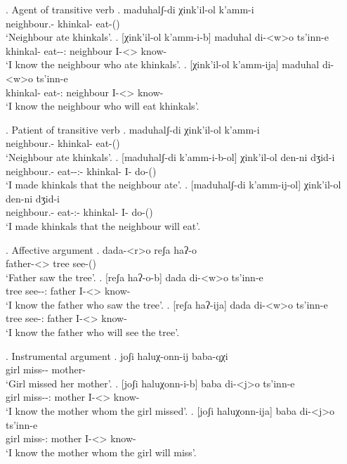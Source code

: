 \ex. Agent of transitive verb
	\ag. maduhalʃ-di χink'il-ol k'amm-i\\
			{neighbour.\Obl-\Erg} {khinkal-\Pl} {eat-\Pst(\Aor)}\\
			\glt `Neighbour ate khinkals'.
	\bg. [χink'il-ol k'amm-i-b] maduhal di-<w>o ts'inn-e \\
			{khinkal-\Pl} {eat-\Pst-\Ptcp:\Pst} neighbour {I-<\M>\Aff} {know-\Hab} \\
		 \glt    `I know the neighbour who ate khinkals'.
	\bg. [χink'il-ol k'amm-ija] maduhal di-<w>o ts'inn-e \\
			{khinkal-\Pl} {eat-\Ptcp:\Prae} neighbour {I-<\M>\Aff} {know-\Hab} \\
		 \glt    `I know the neighbour who will eat khinkals'.

\ex. Patient of transitive verb
	\ag. maduhalʃ-di χink'il-ol k'amm-i\\
			{neighbour.\Obl-\Erg} {khinkal-\Pl} {eat-\Pst(\Aor)}\\
			\glt `Neighbour ate khinkals'.
	\bg. [maduhalʃ-di k'amm-i-b-ol] χink'il-ol den-ni dʒid-i\\
			{neighbour.\Obl-\Erg} {eat-\Pst-\Ptcp:\Pst-\Pl} {khinkal-\Pl}  {I-\Erg} {do-\Pst(\Aor)}\\
		 \glt    `I made khinkals that the neighbour ate'.
	\bg. [maduhalʃ-di k'amm-ij-ol] χink'il-ol den-ni dʒid-i\\
			{neighbour.\Obl-\Erg} {eat-\Ptcp:\Prae-\Pl} {khinkal-\Pl}  {I-\Erg} {do-\Pst(\Aor)}\\
		 \glt    `I made khinkals that the neighbour will eat'.		

\ex. Affective argument
	\ag. dada-<r>o reʃa haʔ-o\\
			{father-<\Nans>\Aff} tree {see-\Pst(\Aor)}\\
			\glt `Father saw the tree'.
	\bg. [reʃa haʔ-o-b] dada di-<w>o ts'inn-e\\
			tree {see-\Pst-\Ptcp:\Pst} father {I-<\M>\Aff} {know-\Hab}\\
			\glt `I know the father who saw the tree'.
	\bg. [reʃa haʔ-ija] dada di-<w>o ts'inn-e\\
			tree {see-\Ptcp:\Prae} father {I-<\M>\Aff} {know-\Hab}\\
			\glt `I know the father who will see the tree'.

\ex. Instrumental argument
	\ag. joʃi haluχ-onn-ij baba-qχi\\
			{girl} {miss-\Pst-\Pf} {mother-\Inst}\\
			\glt `Girl missed her mother'.
	\bg. [joʃi haluχonn-i-b] baba  di-<j>o ts'inn-e\\
			{girl} {miss-\Pst-\Ptcp:\Pst} mother {I-<\M>\Aff} {know-\Hab}\\
			\glt `I know the mother  whom the girl missed'.
	\bg. [joʃi haluχonn-ija] baba  di-<j>o ts'inn-e\\
			{girl} {miss-\Ptcp:\Prae} mother {I-<\M>\Aff} {know-\Hab}\\
			\glt `I know the mother  whom the girl will miss'.

